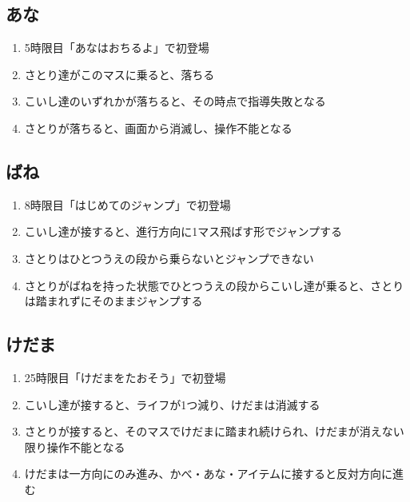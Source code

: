 \subsection{あな}
\begin{enumerate}[label={\sarrow}]
\item 5時限目「あなはおちるよ」で初登場
\item さとり達がこのマスに乗ると、落ちる
\item こいし達のいずれかが落ちると、その時点で指導失敗となる
\item さとりが落ちると、画面から消滅し、操作不能となる
\end{enumerate}


\subsection{ばね}
\begin{enumerate}[label={\sarrow}]
\item 8時限目「はじめてのジャンプ」で初登場
\item こいし達が接すると、進行方向に1マス飛ばす形でジャンプする
\item さとりはひとつうえの段から乗らないとジャンプできない
\item さとりがばねを持った状態でひとつうえの段からこいし達が乗ると、さとりは踏まれずにそのままジャンプする
\end{enumerate}


\subsection{けだま}
\begin{enumerate}[label={\sarrow}]
\item 25時限目「けだまをたおそう」で初登場
\item こいし達が接すると、ライフが1つ減り、けだまは消滅する
\item さとりが接すると、そのマスでけだまに踏まれ続けられ、けだまが消えない限り操作不能となる
\item けだまは一方向にのみ進み、かべ・あな・アイテムに接すると反対方向に進む
\end{enumerate}


